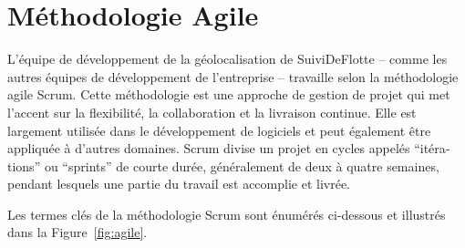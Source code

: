 \section{Méthodologie Agile}\label{sec:agile}

L'équipe de développement de la géolocalisation de SuiviDeFlotte -- comme les autres équipes de développement de l'entreprise -- travaille selon la méthodologie agile Scrum. Cette méthodologie est une approche de gestion de projet qui met l'accent sur la flexibilité, la collaboration et la livraison continue. Elle est largement utilisée dans le développement de logiciels et peut également être appliquée à d'autres domaines. Scrum divise un projet en cycles appelés \foreignquote{french}{itérations} ou \foreignquote{french}{sprints} de courte durée, généralement de deux à quatre semaines, pendant lesquels une partie du travail est accomplie et livrée.

Les termes clés de la méthodologie Scrum sont énumérés ci-dessous et illustrés dans la Figure~\ref{fig:agile}.

